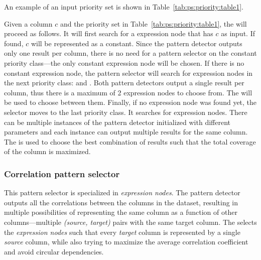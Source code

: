 An example of an input priority set is shown in Table~\ref{tab:ps:priority:table1}.



Given a column \(c\) and the priority set in Table~\ref{tab:ps:priority:table1}, the  will proceed as follows. It will first search for a  expression node that has \(c\) as input. If found, \(c\) will be represented as a constant. Since the  pattern detector outputs only one result per column, there is no need for a pattern selector on the constant priority class---the only constant expression node will be chosen. If there is no constant expression node, the pattern selector will search for expression nodes in the next priority class:  and . Both pattern detectors output a single result per column, thus there is a maximum of 2 expression nodes to choose from. The  will be used to choose between them. Finally, if no expression node was found yet, the selector moves to the last priority class. It searches for  expression nodes.
There can be multiple instances of the  pattern detector initialized with different parameters and each instance can output multiple results for the same column. The  is used to choose the best combination of results such that the total coverage of the column is maximized.

\subsubsection{Correlation pattern selector}
\label{subsubsec:ps:correlation}

This pattern selector is specialized in  \textit{expression nodes}. The  pattern detector outputs all the correlations between the columns in the dataset, resulting in multiple possibilities of representing the same column as a function of other columns---multiple \textit{(source, target)} pairs with the same target column. The  selects the \textit{expression nodes} such that every \textit{target} column is represented by a single \textit{source} column, while also trying to maximize the average correlation coefficient and avoid circular dependencies.

